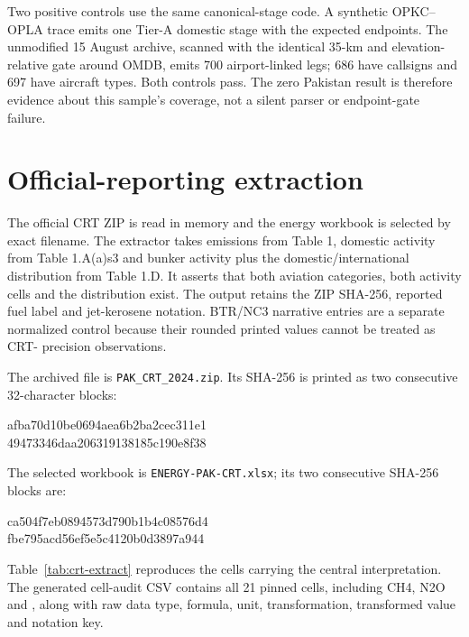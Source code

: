 \documentclass[5p,times,authoryear]{elsarticle}
\begin{document}
Two positive controls use the same canonical-stage code. A synthetic OPKC--OPLA trace emits one
Tier-A domestic stage with the expected endpoints. The unmodified 15 August archive, scanned
with the identical 35-km and elevation-relative gate around OMDB, emits 700 airport-linked legs;
686 have callsigns and 697 have aircraft types. Both controls pass. The zero Pakistan result is
therefore evidence about this sample's coverage, not a silent parser or endpoint-gate failure.

\section{Official-reporting extraction}

The official CRT ZIP is read in memory and the energy workbook is selected by exact filename.
The extractor takes emissions from Table 1, domestic activity from Table 1.A(a)s3 and bunker
activity plus the domestic/international distribution from Table 1.D. It asserts that both
aviation categories, both activity cells and the distribution exist. The output retains the
ZIP SHA-256, reported fuel label and jet-kerosene notation. BTR/NC3 narrative entries are a
separate normalized control because their rounded printed values cannot be treated as CRT-
precision observations.

The archived file is \texttt{PAK\_CRT\_2024.zip}. Its SHA-256 is printed as two consecutive
32-character blocks:
\begin{center}\small\ttfamily
afba70d10be0694aea6b2ba2cec311e1\\
49473346daa206319138185c190e8f38
\end{center}
The selected workbook is \texttt{ENERGY-PAK-CRT.xlsx}; its two consecutive SHA-256 blocks are:
\begin{center}\small\ttfamily
ca504f7eb0894573d790b1b4c08576d4\\
fbe795acd56ef5e5c4120b0d3897a944
\end{center}
Table~\ref{tab:crt-extract} reproduces the cells carrying the central interpretation. The
generated cell-audit CSV contains all 21 pinned cells, including CH4, N2O and \COe{}, along with
raw data type, formula, unit, transformation, transformed value and notation key.
\end{document}
